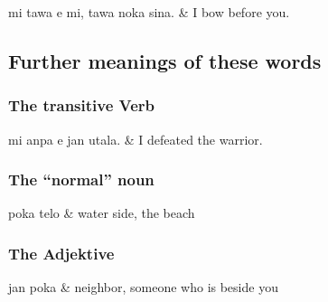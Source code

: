 \begin{translationtable}
    mi tawa e mi, tawa noka sina. & I bow before you. \\
\end{translationtable}

\subsection*{Further meanings of these words}
\subsubsection*{The transitive Verb }

\begin{translationtable}
    mi anpa e jan utala. & I defeated the warrior. \\
\end{translationtable}

\subsubsection*{The ``normal'' noun }

\begin{translationtable}
    poka telo & water side, the beach \\
\end{translationtable}

\subsubsection*{The Adjektive }
\begin{translationtable}
    jan poka & neighbor, someone who is beside you \\
\end{translationtable}

